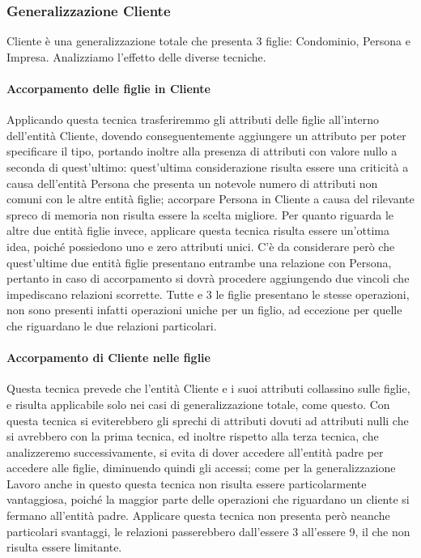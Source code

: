 \documentclass{elegantbook}
\begin{document}
		\subsubsection{Generalizzazione Cliente}
			Cliente è una generalizzazione totale che presenta 3 figlie: Condominio, Persona e Impresa. Analizziamo l'effetto delle diverse tecniche.
		
			\paragraph{Accorpamento delle figlie in Cliente}
				Applicando questa tecnica trasferiremmo gli attributi delle figlie all'interno dell'entità Cliente, dovendo conseguentemente aggiungere un attributo per poter specificare il tipo, portando inoltre alla presenza di attributi con valore nullo a seconda di quest'ultimo: quest'ultima considerazione risulta essere una criticità a causa dell'entità Persona che presenta un notevole numero di attributi non comuni con le altre entità figlie; accorpare Persona in Cliente a causa del rilevante spreco di memoria non risulta essere la scelta migliore. Per quanto riguarda le altre due entità figlie invece, applicare questa tecnica risulta essere un'ottima idea, poiché possiedono uno e zero attributi unici. C'è da considerare però che quest'ultime due entità figlie presentano entrambe una relazione con Persona, pertanto in caso di accorpamento si dovrà procedere aggiungendo due vincoli che impediscano relazioni scorrette. Tutte e 3 le figlie presentano le stesse operazioni, non sono presenti infatti operazioni uniche per un figlio, ad eccezione per quelle che riguardano le due relazioni particolari.
			
			\paragraph{Accorpamento di Cliente nelle figlie}
				Questa tecnica prevede che l'entità Cliente e i suoi attributi collassino sulle figlie, e risulta applicabile solo nei casi di generalizzazione totale, come questo. Con questa tecnica si eviterebbero gli sprechi di attributi dovuti ad attributi nulli che si avrebbero con la prima tecnica, ed inoltre rispetto alla terza tecnica, che analizzeremo successivamente, si evita di dover accedere all'entità padre per accedere alle figlie, diminuendo quindi gli accessi; come per la generalizzazione Lavoro anche in questo questa tecnica non risulta essere particolarmente vantaggiosa, poiché la maggior parte delle operazioni che riguardano un cliente si fermano all'entità padre. Applicare questa tecnica non presenta però neanche particolari svantaggi, le relazioni passerebbero dall'essere 3 all'essere 9, il che non risulta essere limitante.
			
\end{document}
